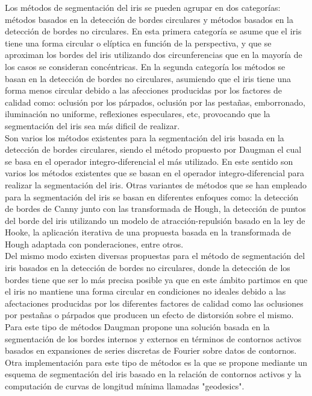 Los métodos de segmentación del iris se pueden agrupar en dos categorías: métodos basados en la detección de bordes circulares y métodos basados en la detección de bordes no circulares. En esta primera categoría se asume que el iris tiene una forma circular o elíptica en función de la perspectiva, y que se aproximan los bordes del iris utilizando dos circunferencias que en la mayoría de los casos se consideran concéntricas. En la segunda categoría los métodos se basan en la detección de bordes no circulares, asumiendo que el iris tiene una forma menos circular debido a las afecciones producidas por los factores de calidad como: oclusión por los párpados, oclusión por las pestañas, emborronado, iluminación no uniforme, reflexiones especulares, etc, provocando que la segmentación del iris sea más dificil de realizar. \\

Son varios los métodos existentes para la segmentación del iris basada en la detección de bordes circulares, siendo el método propuesto por Daugman el cual se basa en el operador integro-diferencial el más utilizado. En este sentido son varios los métodos existentes que se basan en el operador integro-diferencial para realizar la segmentación del iris. Otras variantes de métodos que se han empleado para la segmentación del iris se basan en diferentes enfoques como: la detección de bordes de Canny junto con las transformada de Hough, la detección de puntos del borde del iris utilizando un modelo de atracción-repulsión basado en la ley de Hooke, la aplicación iterativa de una propuesta basada en la transformada de Hough adaptada con ponderaciones, entre otros. \\

Del mismo modo existen diversas propuestas para el método de segmentación del iris basados en la detección de bordes no circulares, donde la detección de los bordes tiene que ser lo más precisa posible ya que en este ámbito partimos en que el iris no mantiene una forma circular en condiciones no ideales debido a las afectaciones producidas por los diferentes factores de calidad como las oclusiones por pestañas o párpados que producen un efecto de distorsión sobre el mismo. Para este tipo de métodos Daugman propone una solución basada en la segmentación de los bordes internos y externos en términos de contornos activos basados en expansiones de series discretas de Fourier sobre datos de contornos. Otra implementación para este tipo de métodos es la que se propone mediante un esquema de segmentación del iris basado en la relación de contornos activos y la computación de curvas de longitud mínima llamadas "geodesics". \\



